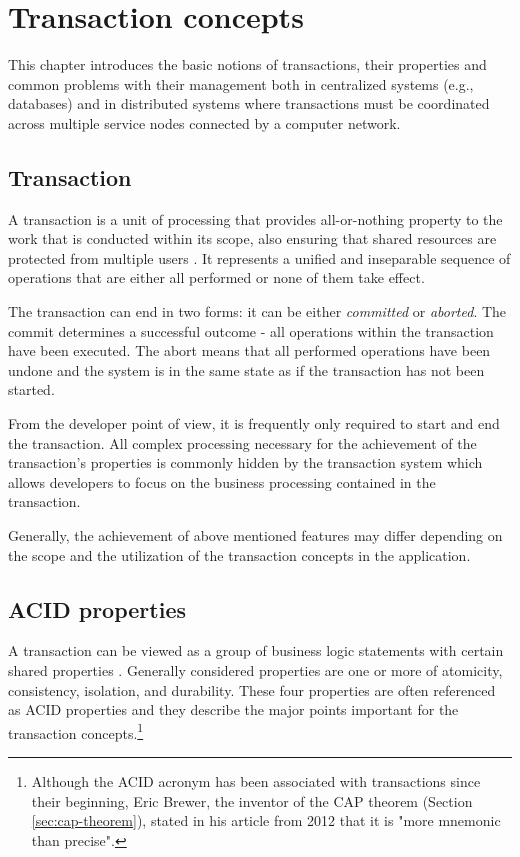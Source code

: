 \documentclass[oneside,
  digital, %
  table,   %
  lof,     %
  lot,     %
]{fithesis3}
\begin{document}
\clearpage
\chapter{Transaction concepts}

This chapter introduces the basic notions of transactions, their properties and common problems with their management both in centralized systems (e.g., databases) and in distributed systems where transactions must be coordinated across multiple service nodes connected by a computer network.

\section{Transaction}

A transaction is a unit of processing that provides all-or-nothing property to the work that is conducted within its scope, also ensuring that shared resources are protected from multiple users \cite{java_tran_processing}. It represents a unified and inseparable sequence of operations that are either all performed or none of them take effect. 

The transaction can end in two forms: it can be either \textit{committed} or \textit{aborted}. The commit determines a successful outcome - all operations within the transaction have been executed. The abort means that all performed operations have been undone and the system is in the same state as if the transaction has not been started.

From the developer point of view, it is frequently only required to start and end the transaction. All complex processing necessary for the achievement of the transaction's properties is commonly hidden by the transaction system \cite{java_tran_processing} which allows developers to focus on the business processing contained in the transaction.

Generally, the achievement of above mentioned features may differ depending on the scope and the utilization of the transaction concepts in the application.

\section{ACID properties}

A transaction can be viewed as a group of business logic statements with certain shared properties \cite{nar_wf}. Generally considered properties are one or more of atomicity, consistency, isolation, and durability. These four properties are often referenced as ACID properties \cite{haerder_reuter_1983} and they describe the major points important for the transaction concepts.\footnote{Although the ACID acronym has been associated with transactions since their beginning, Eric Brewer, the inventor of the CAP theorem (Section \ref{sec:cap-theorem}), stated in his article from 2012 that it is "more mnemonic than precise"\cite{cap_12years}.}
\end{document}
